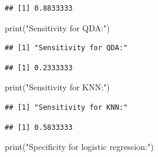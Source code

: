 \documentclass[
]{article}
\newenvironment{Shaded}{\begin{snugshade}}{\end{snugshade}}
\newcommand{\FunctionTok}[1]{\textcolor[rgb]{0.00,0.00,0.00}{#1}}
\newcommand{\NormalTok}[1]{#1}
\newcommand{\SpecialCharTok}[1]{\textcolor[rgb]{0.00,0.00,0.00}{#1}}
\newcommand{\StringTok}[1]{\textcolor[rgb]{0.31,0.60,0.02}{#1}}
\begin{document}
\begin{verbatim}
## [1] 0.8833333
\end{verbatim}

\begin{Shaded}
\begin{Highlighting}[]
\FunctionTok{print}\NormalTok{(}\StringTok{"Sensitivity for QDA:"}\NormalTok{)}
\end{Highlighting}
\end{Shaded}

\begin{verbatim}
## [1] "Sensitivity for QDA:"
\end{verbatim}

\begin{Shaded}
\end{Shaded}

\begin{verbatim}
## [1] 0.2333333
\end{verbatim}

\begin{Shaded}
\begin{Highlighting}[]
\FunctionTok{print}\NormalTok{(}\StringTok{"Sensitivity for KNN:"}\NormalTok{)}
\end{Highlighting}
\end{Shaded}

\begin{verbatim}
## [1] "Sensitivity for KNN:"
\end{verbatim}

\begin{Shaded}
\end{Shaded}

\begin{verbatim}
## [1] 0.5833333
\end{verbatim}

\begin{Shaded}
\begin{Highlighting}[]
\FunctionTok{print}\NormalTok{(}\StringTok{"Specificity for logistic regression:"}\NormalTok{)}
\end{Highlighting}
\end{Shaded}
\end{document}
